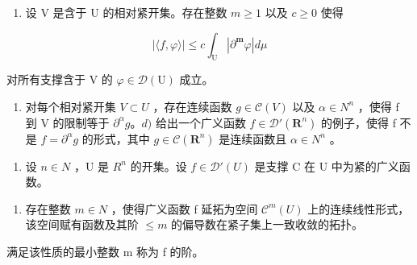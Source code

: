 \begin{enumerate}
\def\labelenumi{\alph{enumi})}
\setcounter{enumi}{1}
\tightlist
\item
  设 V 是含于 U 的相对紧开集。存在整数 \(m \geqslant 1\) 以及 \(c \geqslant 0\) 使得
\end{enumerate}

\[
| \langle f, \varphi \rangle | \leqslant c \int_ {\mathrm{U}} | \partial^ {\boldsymbol {m}} \varphi | d \mu
\]

对所有支撑含于 V 的 \(\varphi\in\mathcal{D}(\mathrm{U})\) 成立。

\begin{enumerate}
\def\labelenumi{\alph{enumi})}
\setcounter{enumi}{2}
\tightlist
\item
  对每个相对紧开集 \(V \subset U\) ，存在连续函数 \(g \in \mathcal{C}(V)\) 以及 \(\alpha \in N^{n}\) ，使得 f 到 V 的限制等于 \(\partial^{\alpha}g\)。\(d)\) 给出一个广义函数 \(f \in \mathcal{D}'(\mathbf{R}^{n})\) 的例子，使得 f 不是 \(f = \partial^{\alpha}g\) 的形式，其中 \(g \in \mathcal{C}(\mathbf{R}^{n})\) 是连续函数且 \(\alpha \in N^{n}\) 。
\end{enumerate}

\begin{enumerate}
\def\labelenumi{\arabic{enumi})}
\setcounter{enumi}{23}
\tightlist
\item
  设 \(n \in N\) ，U 是 \(R^{n}\) 的开集。设 \(f \in \mathcal{D}'(U)\) 是支撑 C 在 U 中为紧的广义函数。
\end{enumerate}

\begin{enumerate}
\def\labelenumi{\alph{enumi})}
\tightlist
\item
  存在整数 \(m \in N\) ，使得广义函数 f 延拓为空间 \(\mathcal{C}^{m}(U)\) 上的连续线性形式，该空间赋有函数及其阶 \(\leqslant m\) 的偏导数在紧子集上一致收敛的拓扑。
\end{enumerate}

满足该性质的最小整数 m 称为 f 的阶。

